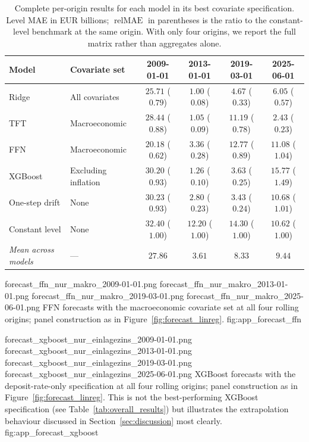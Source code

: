 \documentclass[11pt,a4paper]{article}
\begin{document}
\begin{table}[htbp]
\centering
\small
\caption{Complete per-origin results for each model in its best covariate
specification. Level MAE in EUR billions; $\operatorname{relMAE}$ in
parentheses is the ratio to the constant-level benchmark at the same origin.
With only four origins, we report the full matrix rather than aggregates
alone.}
\label{tab:per_origin}
\begin{tabularx}{\textwidth}{l X c c c c}
\toprule
Model & Covariate set & 2009-01-01 & 2013-01-01 & 2019-03-01 & 2025-06-01 \\
\midrule
Ridge & All covariates
& $25.71$ ($0.79$) & $1.00$ ($0.08$) & $4.67$ ($0.33$) & $6.05$ ($0.57$) \\
TFT & Macroeconomic
& $28.44$ ($0.88$) & $1.05$ ($0.09$) & $11.19$ ($0.78$) & $2.43$ ($0.23$) \\
FFN & Macroeconomic
& $20.18$ ($0.62$) & $3.36$ ($0.28$) & $12.77$ ($0.89$) & $11.08$ ($1.04$) \\
XGBoost & Excluding inflation
& $30.20$ ($0.93$) & $1.26$ ($0.10$) & $3.63$ ($0.25$) & $15.77$ ($1.49$) \\
\midrule
One-step drift & None
& $30.23$ ($0.93$) & $2.80$ ($0.23$) & $3.43$ ($0.24$) & $10.68$ ($1.01$) \\
Constant level & None
& $32.40$ ($1.00$) & $12.20$ ($1.00$) & $14.30$ ($1.00$) & $10.62$ ($1.00$) \\
\midrule
\textit{Mean across models} & ---
& $27.86$ & $3.61$ & $8.33$ & $9.44$ \\
\bottomrule
\end{tabularx}
\end{table}

\originsgrid
  {forecast_ffn_nur_makro_2009-01-01.png}
  {forecast_ffn_nur_makro_2013-01-01.png}
  {forecast_ffn_nur_makro_2019-03-01.png}
  {forecast_ffn_nur_makro_2025-06-01.png}
  {FFN forecasts with the macroeconomic covariate set at all four rolling
   origins; panel construction as in Figure~\ref{fig:forecast_linreg}.}
  {fig:app_forecast_ffn}

\originsgrid
  {forecast_xgboost_nur_einlagezins_2009-01-01.png}
  {forecast_xgboost_nur_einlagezins_2013-01-01.png}
  {forecast_xgboost_nur_einlagezins_2019-03-01.png}
  {forecast_xgboost_nur_einlagezins_2025-06-01.png}
  {XGBoost forecasts with the deposit-rate-only specification at all four
   rolling origins; panel construction as in
   Figure~\ref{fig:forecast_linreg}. This is not the best-performing XGBoost
   specification (see Table~\ref{tab:overall_results}) but illustrates the
   extrapolation behaviour discussed in Section~\ref{sec:discussion} most
   clearly.}
  {fig:app_forecast_xgboost}
\end{document}
